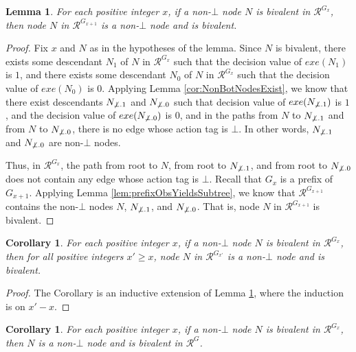 \documentclass[11pt]{article}
\numberwithin{theorem}{section}
\newtheorem{lemma}[theorem]{Lemma}
\newtheorem{corollary}[theorem]{Corollary}
\begin{document}
\begin{lemma}\label{lem:bivalentNodeStableInNextG}
For each positive integer $x$, if a non-$\bot$ node $N$ is bivalent in $\mathcal{R}^{G_x}$, then  node $N$ in $\mathcal{R}^{G_{x+1}}$ is a non-$\bot$ node and is bivalent.
\end{lemma}
\begin{proof}
Fix $x$ and $N$ as in the hypotheses of the lemma.  
Since $N$ is bivalent, there exists some descendant $N_1$ of $N$ in $\mathcal{R}^{G_x}$ such that the decision value of $exe(N_1)$ is $1$, and there exists some descendant $N_0$ of $N$ in $\mathcal{R}^{G_x}$ such that the decision value of $exe(N_0)$ is $0$. Applying Lemma \ref{cor:NonBotNodesExist}, we know that there exist descendants $N_{\not\bot.1}$ and $N_{\not\bot.0}$ such that decision value of $exe(N_{\not\bot.1})$ is $1$, and the decision value of $exe(N_{\not\bot.0})$ is $0$, and in the paths from $N$ to $N_{\not\bot.1}$ and from $N$ to $N_{\not\bot.0}$, there is no edge whose action tag is $\bot$. In other words, $N_{\not\bot.1}$ and $N_{\not\bot.0}$ are non-$\bot$ nodes. 

Thus, in $\mathcal{R}^{G_x}$, the path from root to $N$, from root to $N_{\not\bot.1}$, and from root to $N_{\not\bot.0}$ does not contain any edge whose action tag is $\bot$. Recall that $G_x$ is a prefix of $G_{x+1}$. 
Applying Lemma \ref{lem:prefixObsYieldsSubtree}, we know that $\mathcal{R}^{G_{x+1}}$ contains the non-$\bot$ nodes $N$, $N_{\not\bot.1}$, and $N_{\not\bot.0}$. That is, node $N$ in $\mathcal{R}^{G_{x+1}}$ is bivalent.
\end{proof}

\begin{corollary}\label{cor:bivalentNodeStableInNextG}
For each positive integer $x$, if a non-$\bot$ node $N$ is bivalent in $\mathcal{R}^{G_x}$, then for all positive integers $x'\geq x$, node $N$ in $\mathcal{R}^{G_{x'}}$ is a non-$\bot$ node and is bivalent.
\end{corollary}
\begin{proof}
The Corollary is an inductive extension of Lemma \ref{lem:bivalentNodeStableInNextG}, where the induction is on $x'-x$.
\end{proof}

\begin{corollary}\label{cor:bivalentNodeStableInAllGs}
For each positive integer $x$, if a non-$\bot$ node $N$ is bivalent in $\mathcal{R}^{G_x}$, then $N$ is a non-$\bot$ node and is bivalent in $\mathcal{R}^{G}$.
\end{corollary}
\end{document}
